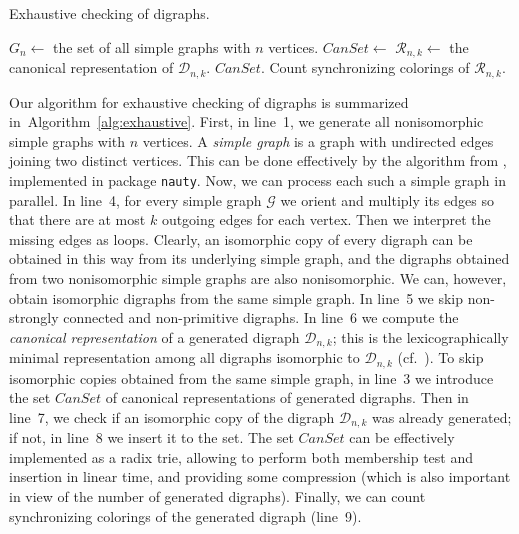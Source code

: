 \documentclass[runningheads]{llncs}
\begin{document}
\begin{algorithm}
\caption{Exhaustive checking of digraphs.}
\label{alg:exhaustive}
\begin{algorithmic}[1]
\State $G_n \gets$ the set of all simple graphs with $n$ vertices.
  \State $\mathit{CanSet} \gets$ 
      \State $\mathcal{R}_{n,k} \gets$ the canonical representation of $\mathcal{D}_{n,k}$.
        \State $\mathit{CanSet}$.
        \State Count synchronizing colorings of $\mathcal{R}_{n,k}$.
      \EndIf
    \EndIf
  \EndFor
\EndFor
\end{algorithmic}
\end{algorithm}

Our algorithm for exhaustive checking of digraphs is summarized in~Algorithm~\ref{alg:exhaustive}.
First, in line~1, we generate all nonisomorphic simple graphs with $n$ vertices. A \emph{simple graph} is a graph with undirected edges joining two distinct vertices. This can be done effectively by the algorithm from \cite{McKayPiperno2014PracticalGraphIsomorphismII}, implemented in package \texttt{nauty}.
Now, we can process each such a simple graph in parallel. In line~4, for every simple graph $\mathcal{G}$ we orient and multiply its edges so that there are at most $k$ outgoing edges for each vertex. Then we interpret the missing edges as loops.
Clearly, an isomorphic copy of every digraph can be obtained in this way from its underlying simple graph, and the digraphs obtained from two nonisomorphic simple graphs are also nonisomorphic. We can, however, obtain isomorphic digraphs from the same simple graph.
In line~5 we skip non-strongly connected and non-primitive digraphs.
In line~6 we compute the \emph{canonical representation} of a generated digraph $\mathcal{D}_{n,k}$; this is the lexicographically minimal representation among all digraphs isomorphic to $\mathcal{D}_{n,k}$ (cf.~\cite{McKayPiperno2014PracticalGraphIsomorphismII}).
To skip isomorphic copies obtained from the same simple graph, in line~3 we introduce the set $\mathit{CanSet}$ of canonical representations of generated digraphs. Then in line~7, we check if an isomorphic copy of the digraph $\mathcal{D}_{n,k}$ was already generated; if not, in line~8 we insert it to the set. The set $\mathit{CanSet}$ can be effectively implemented as a radix trie, allowing to perform both membership test and insertion in linear time, and providing some compression (which is also important in view of the number of generated digraphs).
Finally, we can count synchronizing colorings of the generated digraph (line~9).
\end{document}
